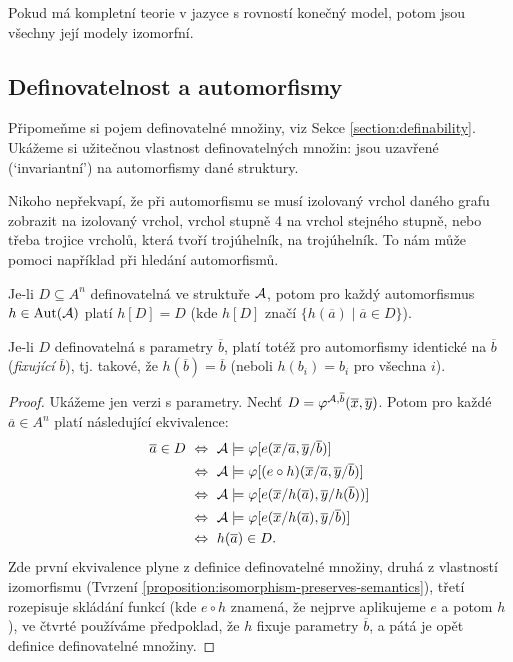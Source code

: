\begin{corollary}
    Pokud má kompletní teorie v jazyce s rovností konečný model, potom jsou všechny její modely izomorfní.
\end{corollary}


\subsection{Definovatelnost a automorfismy}

Připomeňme si pojem definovatelné množiny, viz Sekce \ref{section:definability}. Ukážeme si užitečnou vlastnost definovatelných množin: jsou uzavřené (`invariantní') na automorfismy dané struktury. 

Nikoho nepřekvapí, že při automorfismu se musí izolovaný vrchol daného grafu zobrazit na izolovaný vrchol, vrchol stupně 4 na vrchol stejného stupně, nebo třeba trojice vrcholů, která tvoří trojúhelník, na trojúhelník. To nám může pomoci například při hledání automorfismů.

\begin{proposition}
    Je-li $D\subseteq A^n$ definovatelná ve struktuře $\mathcal{A}$, potom pro každý automorfismus $h\in\operatorname{Aut}(\mathcal{A})$ platí $h[D]=D$ (kde $h[D]$ značí $\{h(\overline{a})\mid\overline{a}\in D\}$).

    Je-li $D$ definovatelná s parametry $\overline{b}$, platí totéž pro automorfismy identické na $\overline{b}$ (\emph{fixující} $\overline{b}$), tj. takové, že $h(\overline{b})=\overline{b}$ (neboli $h(b_i)=b_i$ pro všechna $i$).
\end{proposition}
\begin{proof}
    Ukážeme jen verzi s parametry. Nechť $D=\varphi^{\mathcal{A},\overline{b}}(\overline{x},\overline{y})$. Potom pro každé $\overline{a}\in A^n$ platí následující ekvivalence:
\begin{align*}
\overline{a}\in D\ 
&\Leftrightarrow\ \A\models \varphi[e(\overline{x}/\overline{a},\overline{y}/\overline{b})]\\
&\Leftrightarrow\  \A\models \varphi[(e\circ h)(\overline{x}/\overline{a},\overline{y}/\overline{b})]\\
&\Leftrightarrow\ \A\models \varphi[e(\overline{x}/h(\overline{a}),\overline{y}/h(\overline{b}))]\\
&\Leftrightarrow\ \A\models \varphi[e(\overline{x}/h(\overline{a}),\overline{y}/\overline{b})]\\
&\Leftrightarrow\ h(\overline{a})\in D.
\end{align*}
Zde první ekvivalence plyne z definice definovatelné množiny, druhá z vlastností izomorfismu (Tvrzení \ref{proposition:isomorphism-preserves-semantics}), třetí rozepisuje skládání funkcí (kde $e\circ h$ znamená, že nejprve aplikujeme $e$ a potom $h$), ve čtvrté používáme předpoklad, že $h$ fixuje parametry $\overline{b}$, a pátá je opět definice definovatelné množiny.
\end{proof}

